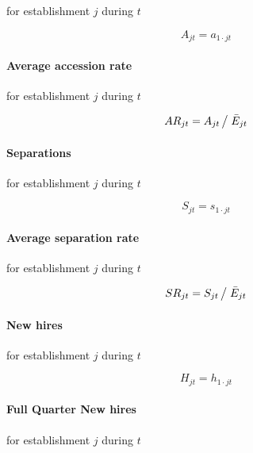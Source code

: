 for establishment $j$ during $t$

\begin{equation}
A_{jt} = a_{1\cdot jt}
\end{equation}

\paragraph{Average accession rate}

for establishment $j$ during $t$

\begin{equation}
AR_{jt} = {A_{jt} } \left/ {\vphantom {{A_{jt} } {\bar {E}_{jt} }}} \right. {%
\bar{E}_{jt} }
\end{equation}

\paragraph{Separations}

for establishment $j$ during $t$

\begin{equation}
S_{jt} = s_{1\cdot jt}
\end{equation}

\paragraph{Average separation rate}

for establishment $j$ during $t$

\begin{equation}
SR_{jt} = {S_{jt} } \left/ {\vphantom {{S_{jt} } {\bar {E}_{jt} }}} \right. {%
\bar{E}_{jt} }
\end{equation}

\paragraph{New hires}

for establishment $j$ during $t$

\begin{equation}
H_{jt}=h_{1\cdot jt}
\end{equation}

\paragraph{Full Quarter New hires}

for establishment $j$ during $t$

